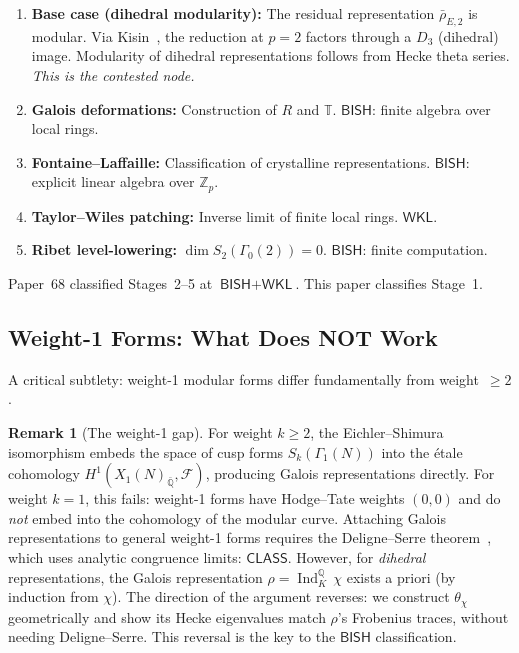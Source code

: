 \documentclass[11pt,a4paper]{article}
\theoremstyle{plain}
\theoremstyle{definition}
\newtheorem{remark}[theorem]{Remark}
\newcommand{\BISH}{\textsf{BISH}}
\newcommand{\WKL}{\textsf{WKL}}
\newcommand{\CLASS}{\textsf{CLASS}}
\newcommand{\Z}{\mathbb{Z}}
\newcommand{\Q}{\mathbb{Q}}
\DeclareMathOperator{\Ind}{Ind}
\begin{document}
\begin{enumerate}[label=\textbf{Stage \arabic*:}]
\item \textbf{Base case (dihedral modularity):} The residual representation $\bar{\rho}_{E,2}$ is modular. Via Kisin~\cite{kisin09}, the reduction at $p = 2$ factors through a $D_3$ (dihedral) image. Modularity of dihedral representations follows from Hecke theta series. \emph{This is the contested node.}
\item \textbf{Galois deformations:} Construction of $R$ and $\mathbb{T}$. $\BISH$: finite algebra over local rings.
\item \textbf{Fontaine--Laffaille:} Classification of crystalline representations. $\BISH$: explicit linear algebra over $\Z_p$.
\item \textbf{Taylor--Wiles patching:} Inverse limit of finite local rings. $\WKL$.
\item \textbf{Ribet level-lowering:} $\dim S_2(\Gamma_0(2)) = 0$. $\BISH$: finite computation.
\end{enumerate}

Paper~68 classified Stages~2--5 at $\BISH + \WKL$. This paper classifies Stage~1.

\subsection{Weight-1 Forms: What Does NOT Work}

A critical subtlety: weight-1 modular forms differ fundamentally from weight~$\geq 2$.

\begin{remark}[The weight-1 gap]\label{rem:weight1}
For weight $k \geq 2$, the Eichler--Shimura isomorphism embeds the space of cusp forms $S_k(\Gamma_1(N))$ into the \'etale cohomology $H^1(X_1(N)_{\bar{\Q}}, \mathcal{F})$, producing Galois representations directly.
For weight $k = 1$, this fails: weight-1 forms have Hodge--Tate weights $(0,0)$ and do \emph{not} embed into the cohomology of the modular curve.
Attaching Galois representations to general weight-1 forms requires the Deligne--Serre theorem~\cite{deligne-serre74}, which uses analytic congruence limits: $\CLASS$.
However, for \emph{dihedral} representations, the Galois representation $\rho = \Ind_K^\Q\, \chi$ exists a priori (by induction from $\chi$).
The direction of the argument reverses: we construct $\theta_\chi$ geometrically and show its Hecke eigenvalues match $\rho$'s Frobenius traces, without needing Deligne--Serre.
This reversal is the key to the $\BISH$ classification.
\end{remark}
\end{document}
